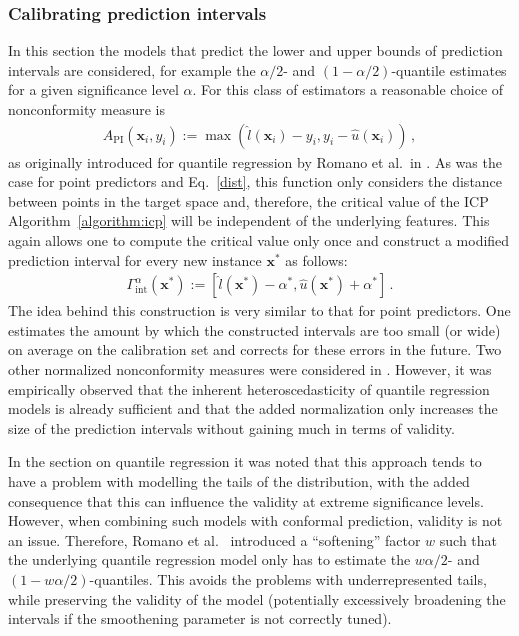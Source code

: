 \documentclass[smallcondensed]{svjour3}
\begin{document}
\subsubsection*{Calibrating prediction intervals}

    In this section the models that predict the lower and upper bounds of prediction intervals are considered, for example the $\alpha/2$- and $(1-\alpha/2)$-quantile estimates for a given significance level $\alpha$. For this class of estimators a reasonable choice of nonconformity measure is
    \begin{gather}
        A_\text{PI}(\mathbf{x}_i,y_i) := \max\left(\hat{l}(\mathbf{x}_i)-y_i, y_i-\hat{u}(\mathbf{x}_i)\right)\,,
    \end{gather}
    as originally introduced for quantile regression by Romano et al.\ in \cite{romano2019conformalized}. As was the case for point predictors and Eq.\ \eqref{dist}, this function only considers the distance between points in the target space and, therefore, the critical value of the ICP Algorithm~\ref{algorithm:icp} will be independent of the underlying features. This again allows one to compute the critical value only once and construct a modified prediction interval for every new instance $\mathbf{x}^*$ as follows:
    \begin{gather}
        \Gamma^\alpha_\text{int}(\mathbf{x}^*) := \left[\hat{l}(\mathbf{x}^*) - \alpha^*, \hat{u}(\mathbf{x}^*) + \alpha^*\right]\,.
    \end{gather}
    The idea behind this construction is very similar to that for point predictors. One estimates the amount by which the constructed intervals are too small (or wide) on average on the calibration set and corrects for these errors in the future. Two other normalized nonconformity measures were considered in \cite{kivaranovic2020adaptive,sesia2020comparison}. However, it was empirically observed that the inherent heteroscedasticity of quantile regression models is already sufficient and that the added normalization only increases the size of the prediction intervals without gaining much in terms of validity.

    In the section on quantile regression it was noted that this approach tends to have a problem with modelling the tails of the distribution, with the added consequence that this can influence the validity at extreme significance levels. However, when combining such models with conformal prediction, validity is not an issue. Therefore, Romano et al.~\cite{romano2019conformalized} introduced a ``softening'' factor $w$ such that the underlying quantile regression model only has to estimate the $w\alpha/2$- and $(1-w\alpha/2)$-quantiles. This avoids the problems with underrepresented tails, while preserving the validity of the model (potentially excessively broadening the intervals if the smoothening parameter is not correctly tuned).
\end{document}

